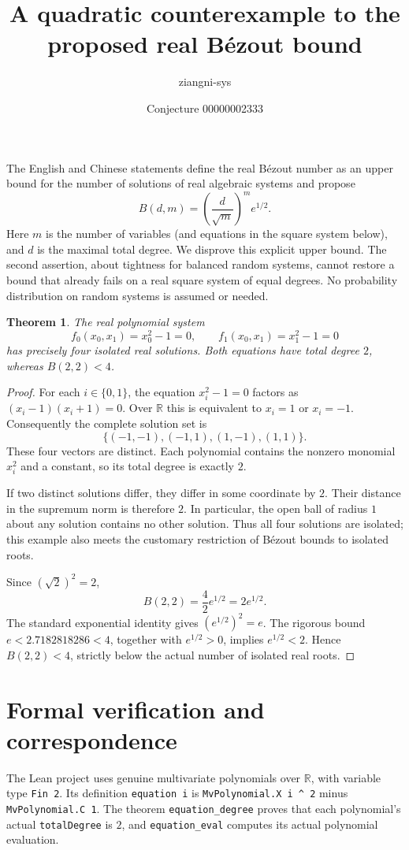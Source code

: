 \documentclass[11pt]{article}
\title{A quadratic counterexample to the proposed real B\'ezout bound}
\author{ziangni-sys}
\date{Conjecture 00000002333}
\newtheorem{theorem}{Theorem}
\begin{document}
\sloppy
\maketitle
\noindent The English and Chinese statements define the real B\'ezout number as
an upper bound for the number of solutions of real algebraic systems and propose
\[
 B(d,m)=\left(\frac{d}{\sqrt m}\right)^m e^{1/2}.
\]
Here $m$ is the number of variables (and equations in the square system below),
and $d$ is the maximal total degree. We disprove this explicit upper bound.
The second assertion, about tightness for balanced random systems, cannot
restore a bound that already fails on a real square system of equal degrees.
No probability distribution on random systems is assumed or needed.

\begin{theorem}
The real polynomial system
\[
 f_0(x_0,x_1)=x_0^2-1=0,\qquad
 f_1(x_0,x_1)=x_1^2-1=0
\]
has precisely four isolated real solutions. Both equations have total degree
$2$, whereas $B(2,2)<4$.
\end{theorem}
\begin{proof}
For each $i\in\{0,1\}$, the equation $x_i^2-1=0$ factors as
$(x_i-1)(x_i+1)=0$. Over $\mathbb R$ this is equivalent to $x_i=1$ or $x_i=-1$.
Consequently the complete solution set is
\[
 \{(-1,-1),(-1,1),(1,-1),(1,1)\}.
\]
These four vectors are distinct. Each polynomial contains the nonzero monomial
$x_i^2$ and a constant, so its total degree is exactly $2$.

If two distinct solutions differ, they differ in some coordinate by $2$.
Their distance in the supremum norm is therefore $2$. In particular, the
open ball of radius $1$ about any solution contains no other solution. Thus
all four solutions are isolated; this example also meets the customary
restriction of B\'ezout bounds to isolated roots.

Since $(\sqrt2)^2=2$,
\[
 B(2,2)=\frac{4}{2}e^{1/2}=2e^{1/2}.
\]
The standard exponential identity gives $(e^{1/2})^2=e$. The rigorous bound
$e<2.7182818286<4$, together with $e^{1/2}>0$, implies $e^{1/2}<2$.
Hence $B(2,2)<4$, strictly below the actual number of isolated real roots.
\end{proof}

\newpage
\section*{Formal verification and correspondence}
The Lean project uses genuine multivariate polynomials over $\mathbb R$, with
variable type \texttt{Fin 2}. Its definition \texttt{equation i} is
\texttt{MvPolynomial.X i \^{} 2} minus \texttt{MvPolynomial.C 1}.
The theorem \texttt{equation\_degree} proves that each polynomial's actual
\texttt{totalDegree} is $2$, and \texttt{equation\_eval} computes its actual
polynomial evaluation.
\end{document}
